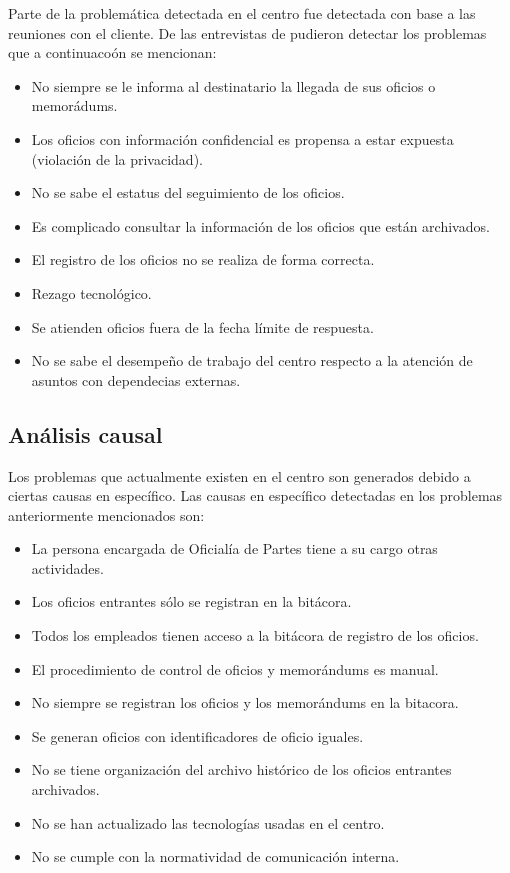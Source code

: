 Parte de la problemática detectada en el centro fue detectada con base a las reuniones con el cliente. De las entrevistas de pudieron detectar los problemas que a continuacoón se mencionan:

\begin{itemize}
	
	\item No siempre se le informa al destinatario la llegada de sus oficios o memorádums.
	\item Los oficios con información confidencial es propensa a estar expuesta (violación de la privacidad).
	\item No se sabe el estatus del seguimiento de los oficios.
	\item Es complicado consultar la información de los oficios que están archivados.
	\item El registro de los oficios no se realiza de forma correcta.
	\item Rezago tecnológico.
	\item Se atienden oficios fuera de la fecha límite de respuesta.
	\item No se sabe el desempeño de trabajo del centro respecto a la atención de asuntos con dependecias externas.
	
\end{itemize}

\subsection{Análisis causal}

Los problemas que actualmente existen en el centro son generados debido a ciertas causas en específico. Las causas en específico detectadas en los problemas anteriormente mencionados son:

\begin{itemize}
	
	\item La persona encargada de Oficialía de Partes tiene a su cargo otras actividades.
	\item Los oficios entrantes sólo se registran en la bitácora.
	\item Todos los empleados tienen acceso a la bitácora de registro de los oficios.
	\item El procedimiento de control de oficios y memorándums es manual.
	\item No siempre se registran los oficios y los memorándums en la bitacora.
	\item Se generan oficios con identificadores de oficio iguales.
	\item No se tiene organización del archivo histórico de los oficios entrantes archivados.
	\item No se han actualizado las tecnologías usadas en el centro.
	\item No se cumple con la normatividad de comunicación interna.
	
\end{itemize}

